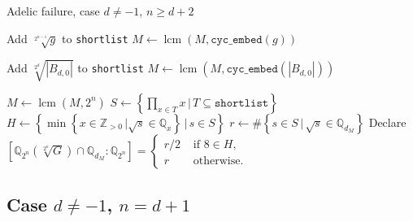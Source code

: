 \documentclass[10pt,a4paper]{report}
\DeclareMathOperator{\lcm}{lcm}
\theoremstyle{definition}
\begin{document}
\begin{algorithm}
\caption{Adelic failure, case $d\neq -1$, $n\geq d+2$}
\begin{algorithmic}
\State Add $\sqrt[2^{n-1}]{g}$ to \texttt{shortlist}
\State $M\leftarrow\lcm(M,\texttt{cyc\_embed}(g))$
\EndFor
\EndIf
\State

\State Add $\sqrt[2^{d}]{|B_{d,0}|}$ to \texttt{shortlist}
\State $M\leftarrow\lcm(M,\texttt{cyc\_embed}(|B_{d,0}|))$
\EndIf

\State
\State $M\leftarrow\lcm(M,2^{n})$
\State
{}
\State $S\leftarrow\left\{\prod_{x\in T}x\,|\,T\subseteq\texttt{shortlist}\right\}$
\State $H\leftarrow\left\{\min\left\{x\in\mathbb{Z}_{>0}\,|\sqrt{s}\in \mathbb{Q}_x\right\}\,|\,s\in S\right\}$
\State $r\leftarrow\# \left\{s\in S\,|\, \sqrt{s}\in\mathbb{Q}_{d_M}\right\}$
\State Declare $\left[\mathbb{Q}_{2^n}\left(\sqrt[2^n]{G}\right)\cap \mathbb{Q}_{d_M}:\mathbb{Q}_{2^n}\right]=\begin{cases}
r/2&\text{ if }8\in H,\\
r&\text{ otherwise}.
\end{cases}$
\EndFor
\end{algorithmic}

\end{algorithm}

\pagebreak

\subsection*{Case $d\neq -1$, $n= d+1$}
\end{document}
